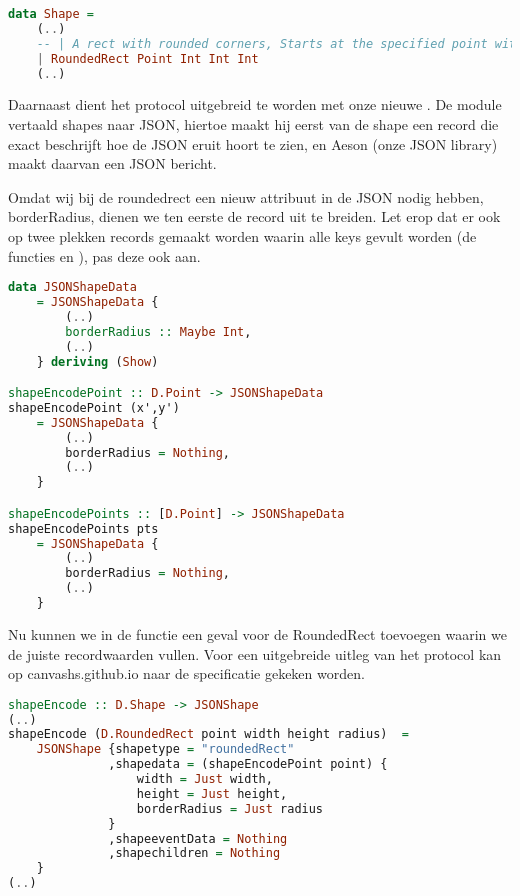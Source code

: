 \begin{lstlisting}[style=densecode, language=Haskell]
data Shape =
    (..)
    -- | A rect with rounded corners, Starts at the specified point with a width (growing to the left), height (growing down), and a borderradius
    | RoundedRect Point Int Int Int
    (..)
\end{lstlisting} 

Daarnaast dient het protocol uitgebreid te worden met onze nieuwe . De module  vertaald shapes naar JSON, hiertoe maakt hij eerst van de shape een record die exact beschrijft hoe de JSON eruit hoort te zien, en Aeson (onze JSON library) maakt daarvan een JSON bericht.

Omdat wij bij de roundedrect een nieuw attribuut in de JSON nodig hebben, borderRadius, dienen we ten eerste de  record uit te breiden. Let erop dat er ook op twee plekken records gemaakt worden waarin alle keys gevult worden (de functies  en ), pas deze ook aan.

\begin{lstlisting}[style=densecode, language=Haskell]
data JSONShapeData
    = JSONShapeData { 
        (..)
        borderRadius :: Maybe Int,
        (..)
    } deriving (Show)

shapeEncodePoint :: D.Point -> JSONShapeData
shapeEncodePoint (x',y')    
    = JSONShapeData { 
        (..)
        borderRadius = Nothing,
        (..)
    }

shapeEncodePoints :: [D.Point] -> JSONShapeData
shapeEncodePoints pts
    = JSONShapeData { 
        (..)
        borderRadius = Nothing,
        (..)
    }
\end{lstlisting}

Nu kunnen we in de functie  een geval voor de RoundedRect toevoegen waarin we de juiste recordwaarden vullen. Voor een uitgebreide uitleg van het protocol kan op canvashs.github.io naar de specificatie gekeken worden.

\begin{lstlisting}[style=densecode, language=Haskell]
shapeEncode :: D.Shape -> JSONShape
(..)
shapeEncode (D.RoundedRect point width height radius)  = 
    JSONShape {shapetype = "roundedRect" 
              ,shapedata = (shapeEncodePoint point) {
                  width = Just width, 
                  height = Just height, 
                  borderRadius = Just radius
              }
              ,shapeeventData = Nothing
              ,shapechildren = Nothing
    }
(..)
\end{lstlisting}
